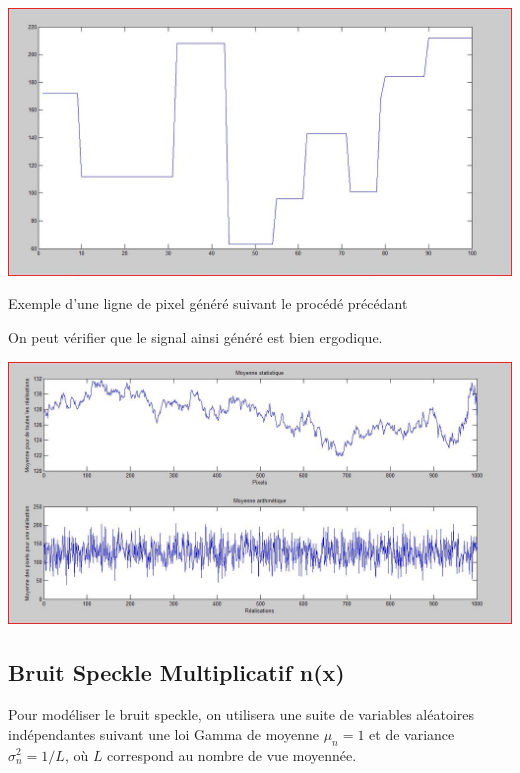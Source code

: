 \documentclass[a4paper,11pt]{article}
\newcommand{\FSource}[1]{%
  
  }
\begin{document}
\vspace{0.5cm}

\FSource{matlab/genligne.m}

\vspace{0.5cm}

\includegraphics[width=15cm]{capture/Capturer.JPG}
\begin{center}Exemple d'une ligne de pixel généré suivant le procédé
précédant\end{center}

On peut vérifier que le signal ainsi généré est bien ergodique.


\includegraphics[width=15cm]{capture/ergo.JPG}

\subsection{Bruit Speckle Multiplicatif n(x)}

Pour modéliser le bruit speckle, on utilisera une suite de variables aléatoires indépendantes suivant une loi Gamma de moyenne $\mu_n = 1$ et de variance $\sigma_n^2 = 1/L$, où $L$ correspond au nombre de vue moyennée.
\end{document}
